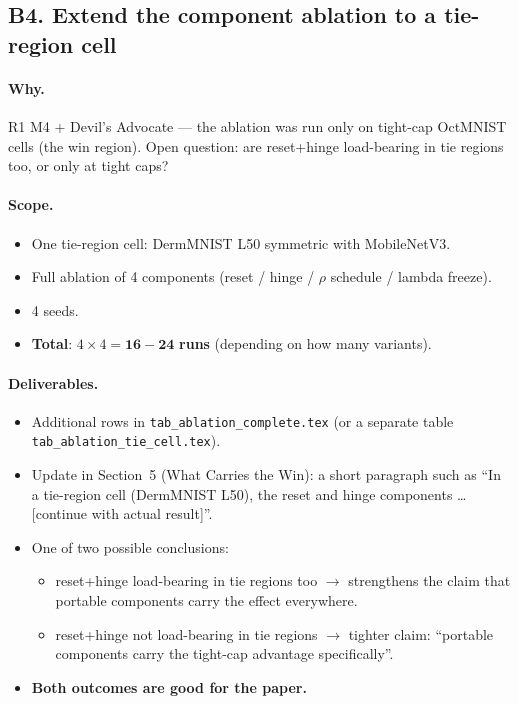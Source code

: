 \documentclass[11pt,a4paper]{article}
\newcommand{\file}[1]{\texttt{#1}}
\begin{document}
\subsection{B4. Extend the component ablation to a tie-region cell}

\paragraph{Why.} R1 M4 + Devil's Advocate --- the ablation was run only on
tight-cap OctMNIST cells (the win region). Open question: are reset+hinge
load-bearing in tie regions too, or only at tight caps?

\paragraph{Scope.}
\begin{itemize}[nosep]
  \item One tie-region cell: DermMNIST L50 symmetric with MobileNetV3.
  \item Full ablation of 4 components (reset / hinge / $\rho$ schedule /
        lambda freeze).
  \item 4 seeds.
  \item \textbf{Total}: $4 \times 4 = \mathbf{16{-}24}$ \textbf{runs}
        (depending on how many variants).
\end{itemize}

\paragraph{Deliverables.}
\begin{itemize}[nosep]
  \item Additional rows in \file{tab\_ablation\_complete.tex} (or a
        separate table \file{tab\_ablation\_tie\_cell.tex}).
  \item Update in Section~5 (What Carries the Win): a short paragraph
        such as ``In a tie-region cell (DermMNIST L50), the reset and
        hinge components \dots{} [continue with actual result]''.
  \item One of two possible conclusions:
    \begin{itemize}[nosep]
      \item reset+hinge load-bearing in tie regions too $\to$ strengthens
            the claim that portable components carry the effect everywhere.
      \item reset+hinge not load-bearing in tie regions $\to$ tighter claim:
            ``portable components carry the tight-cap advantage
            specifically''.
    \end{itemize}
  \item \textbf{Both outcomes are good for the paper.}
\end{itemize}
\end{document}
